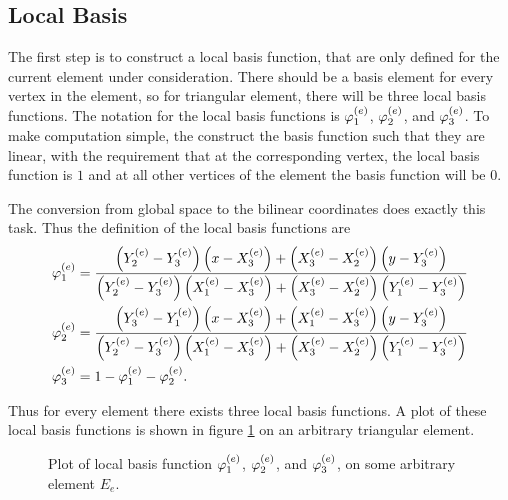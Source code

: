 \documentclass[../fem.tex]{subfile}
\begin{document}
\subsection{Local Basis}%
\label{sub:local_basis}

The first step is to construct a local basis function, that are only defined
for the current element under consideration. There should be a basis element
for every vertex in the element, so for triangular element, there will be three
local basis functions. The notation for the local basis functions is
$\varphi^{(e)}_1$, $\varphi^{(e)}_2$, and $\varphi^{(e)}_3$. To make computation simple, the
construct the basis function such that they are linear, with the requirement
that at the corresponding vertex, the local basis function is $1$ and at all
other vertices of the element the basis function will be $0$.

The conversion from global space to the bilinear coordinates does exactly this
task. Thus the definition of the local basis functions are
\begin{align}
  \begin{split}
    \varphi^{(e)}_1&=\frac{\left(Y^{(e)}_2-Y^{(e)}_3\right)\left(x-X^{(e)}_3\right)+\left(X^{(e)}_3-X^{(e)}_2\right)\left(y-Y^{(e)}_3\right)}{\left(Y^{(e)}_2-Y^{(e)}_3\right)\left(X^{(e)}_1-X^{(e)}_3\right)+\left(X^{(e)}_3-X^{(e)}_2\right)\left(Y^{(e)}_1-Y^{(e)}_3\right)}\\
    \varphi^{(e)}_2&=\frac{\left(Y^{(e)}_3-Y^{(e)}_1\right)\left(x-X^{(e)}_3\right)+\left(X^{(e)}_1-X^{(e)}_3\right)\left(y-Y^{(e)}_3\right)}{\left(Y^{(e)}_2-Y^{(e)}_3\right)\left(X^{(e)}_1-X^{(e)}_3\right)+\left(X^{(e)}_3-X^{(e)}_2\right)\left(Y^{(e)}_1-Y^{(e)}_3\right)}\\
    \varphi^{(e)}_3&=1-\varphi^{(e)}_1-\varphi^{(e)}_2.
  \end{split}
\end{align}

Thus for every element there exists three local basis functions. A plot of
these local basis functions is shown in figure \ref{fig:local_basis} on an
arbitrary triangular element.

\begin{figure}[htpb]
  \begin{center}
  \end{center}
  \caption{Plot of local basis function $\varphi^{(e)}_1$, $\varphi^{(e)}_2$, and $\varphi^{(e)}_3$,
  on some arbitrary element $E_e$.}
  \label{fig:local_basis}
\end{figure}
\end{document}
